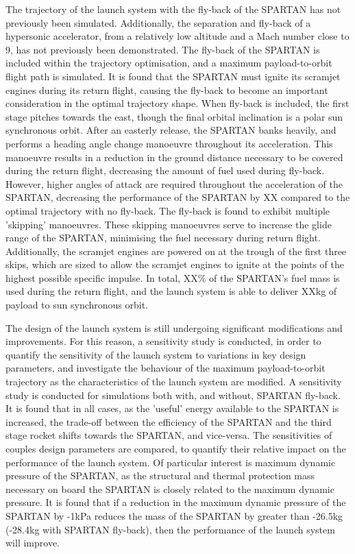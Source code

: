  The trajectory of the launch system with the fly-back of the SPARTAN has not previously been simulated. Additionally, the separation and fly-back of a hypersonic accelerator, from a relatively low altitude and a Mach number close to 9, has not previously been demonstrated. 
 The fly-back of the SPARTAN is included within the trajectory optimisation, and a maximum payload-to-orbit flight path is simulated. 
 It is found that the SPARTAN must ignite its scramjet engines during its return flight, causing the fly-back to become an important consideration in the optimal trajectory shape. When fly-back is included, the first stage pitches towards the east, though the final orbital inclination is a polar sun synchronous orbit.  
After an easterly release, the SPARTAN banks heavily, and performs a heading angle change manoeuvre throughout its acceleration. This manoeuvre results in a reduction in the ground distance necessary to be covered during the return flight, decreasing the amount of fuel used during fly-back. However, higher angles of attack are required throughout the acceleration of the SPARTAN, decreasing the performance of the SPARTAN by XX compared to the optimal trajectory with no fly-back. 
The fly-back is found to exhibit multiple 'skipping' manoeuvres. These skipping manoeuvres serve to increase the glide range of the SPARTAN, minimising the fuel necessary during return flight. Additionally, the scramjet engines are powered on at the trough of the first three skips, which are sized to allow the scramjet engines to ignite at the points of the highest possible specific impulse. In total, XX\% of the SPARTAN's fuel mass is used during the return flight, and the launch system is able to deliver XXkg of payload to sun synchronous orbit.

The design of the launch system is still undergoing significant modifications and improvements.
For this reason, a sensitivity study is conducted, in order to quantify the sensitivity of the launch system to variations in key design parameters, and investigate the behaviour of the maximum payload-to-orbit trajectory as the characteristics of the launch system are modified. A sensitivity study is conducted for simulations both with, and without, SPARTAN fly-back. 
It is found that in all cases, as the 'useful' energy available to the SPARTAN is increased, the trade-off between the efficiency of the SPARTAN and the third stage rocket shifts towards the SPARTAN, and vice-versa.
The sensitivities of couples design parameters are compared, to quantify their relative impact on the performance of the launch system. Of particular interest is maximum dynamic pressure of the SPARTAN, as the structural and thermal protection mass necessary on board the SPARTAN is closely related to the maximum dynamic pressure. It is found that if a reduction in the maximum dynamic pressure of the SPARTAN by -1kPa reduces the mass of the SPARTAN by greater than -26.5kg (-28.4kg with SPARTAN fly-back), then the performance of the launch system will improve. 

